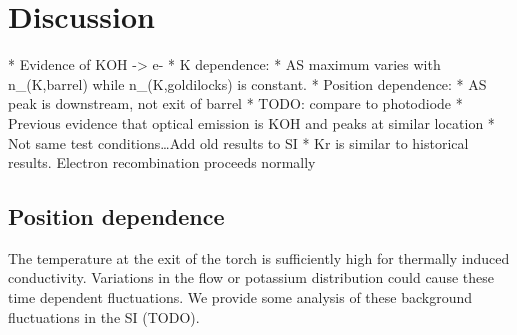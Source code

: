\section{Discussion}

\begin{markdown}
* Evidence of KOH -> e-
    * K dependence: 
    * AS maximum varies with n_(K,barrel) while n_(K,goldilocks)  is constant. 
* Position dependence: 
    * AS peak is downstream, not exit of barrel
    * TODO: compare to photodiode
    * Previous evidence that optical emission is KOH and peaks at similar location
    * Not same test conditions…Add old results to SI
* Kr is similar to historical results. Electron recombination proceeds normally
\end{markdown}

\subsection{Position dependence}

The temperature at the exit of the torch is sufficiently high for thermally induced conductivity. Variations in the flow or potassium distribution could cause these time dependent fluctuations. We provide some analysis of these background fluctuations in the SI (TODO).
